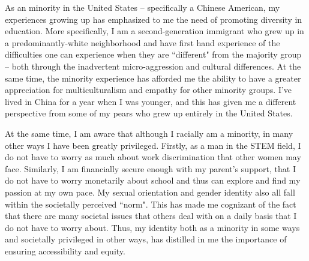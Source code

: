\documentclass[12pt]{article}
\begin{document}





As an minority in the United States -- specifically a Chinese American, my experiences growing up has emphasized to me the need of promoting diversity in education. More specifically, I am a second-generation immigrant who grew up in a predominantly-white neighborhood and have first hand experience of the difficulties one can experience when they are ``different" from the majority group -- both through the inadvertent micro-aggression and cultural differences. At the same time, the minority experience has afforded me the ability to have a greater appreciation for multiculturalism and empathy for other minority groups. I've lived in China for a year when I was younger, and this has given me a different perspective from some of my pears who grew up entirely in the United States.

At the same time, I am aware that although I racially am a minority, in many other ways I have been greatly privileged. Firstly, as a man in the STEM field, I do not have to worry as much about work discrimination that other women may face. Similarly, I am financially secure enough with my parent's support, that I do not have to worry monetarily about school and thus can explore and find my passion at my own pace. My sexual orientation and gender identity also all fall within the societally perceived ``norm". This has made me cognizant of the fact that there are many societal issues that others deal with on a daily basis that I do not have to worry about. Thus, my identity both as a minority in some ways and societally privileged in other ways, has distilled in me the importance of ensuring accessibility and equity.
\end{document}
